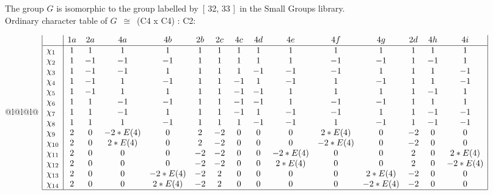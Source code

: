 \documentclass[varwidth=\maxdimen,border=10]{standalone}
\begin{document}
The group $G$ is isomorphic to the group labelled by\ [ 32, 33 ]\ in the Small Groups library.\\
Ordinary character table of $G$\ $\cong$\ (C4 x C4) : C2:\\
\begin{center}
\begin{tabular}{@{}l@{}l@{}l@{}}
\hline
\(\begin{array}{|l|cccccccccccccc|}
  & 1a & 2a & 4a & 4b & 2b & 2c & 4c & 4d & 4e & 4f & 4g & 2d & 4h & 4i\\ \hline
\chi_{1} & 1 & 1 & 1 & 1 & 1 & 1 & 1 & 1 & 1 & 1 & 1 & 1 & 1 & 1\\
\chi_{2} & 1 & -1 & -1 & -1 & 1 & 1 & 1 & 1 & 1 & -1 & -1 & 1 & -1 & 1\\
\chi_{3} & 1 & -1 & -1 & 1 & 1 & 1 & 1 & -1 & -1 & -1 & 1 & 1 & 1 & -1\\
\chi_{4} & 1 & -1 & 1 & -1 & 1 & 1 & -1 & 1 & -1 & 1 & -1 & 1 & 1 & -1\\
\chi_{5} & 1 & -1 & 1 & 1 & 1 & 1 & -1 & -1 & 1 & 1 & 1 & 1 & -1 & 1\\
\chi_{6} & 1 & 1 & -1 & -1 & 1 & 1 & -1 & -1 & 1 & -1 & -1 & 1 & 1 & 1\\
\chi_{7} & 1 & 1 & -1 & 1 & 1 & 1 & -1 & 1 & -1 & -1 & 1 & 1 & -1 & -1\\
\chi_{8} & 1 & 1 & 1 & -1 & 1 & 1 & 1 & -1 & -1 & 1 & -1 & 1 & -1 & -1\\
\chi_{9} & 2 & 0 & -2*E(4) & 0 & 2 & -2 & 0 & 0 & 0 & 2*E(4) & 0 & -2 & 0 & 0\\
\chi_{10} & 2 & 0 & 2*E(4) & 0 & 2 & -2 & 0 & 0 & 0 & -2*E(4) & 0 & -2 & 0 & 0\\
\chi_{11} & 2 & 0 & 0 & 0 & -2 & -2 & 0 & 0 & -2*E(4) & 0 & 0 & 2 & 0 & 2*E(4)\\
\chi_{12} & 2 & 0 & 0 & 0 & -2 & -2 & 0 & 0 & 2*E(4) & 0 & 0 & 2 & 0 & -2*E(4)\\
\chi_{13} & 2 & 0 & 0 & -2*E(4) & -2 & 2 & 0 & 0 & 0 & 0 & 2*E(4) & -2 & 0 & 0\\
\chi_{14} & 2 & 0 & 0 & 2*E(4) & -2 & 2 & 0 & 0 & 0 & 0 & -2*E(4) & -2 & 0 & 0\\
\hline
\end{array}\)\\
\end{tabular}
\end{center}
\end{document}
